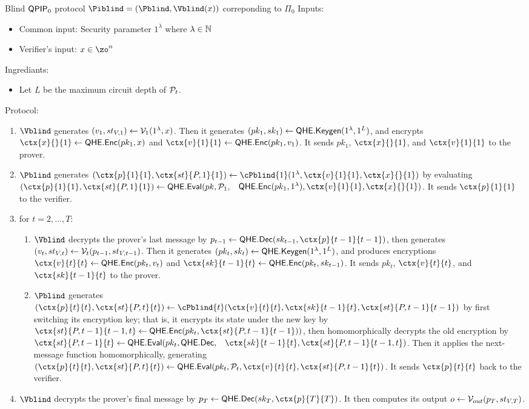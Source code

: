 \begin{protocol}{Blind $\operatorname{\mathsf{QPIP}}_0$ protocol $\Piblind=(\Pblind, \Vblind(x))$ correponding to $\Pi_0$}
	Inputs:
	\begin{itemize}
		\item Common input: Security parameter $1^\lambda$ where $\lambda\in\mathbb{N}$
		\item Verifier's input: $x\in\zo^n$
	\end{itemize}

	Ingrediants:
	\begin{itemize}
		\item Let $L$ be the maximum circuit depth of $\mathcal{P}_t$.
	\end{itemize}

    Protocol:
	\begin{enumerate}
		\item $\Vblind$ generates $(v_1, st_{V, 1})\leftarrow\mathcal{V}_1(1^\lambda, x)$.
			Then it generates $(pk_1, sk_1)\leftarrow\mathsf{QHE.Keygen}(1^\lambda, 1^L)$,
			and encrypts $\ctx{x}{}{1}\leftarrow\QEnc(pk_1, x)$ and $\ctx{v}{1}{1}\leftarrow\QEnc(pk_1, v_1)$.
			It sends $pk_1$, $\ctx{x}{}{1}$, and $\ctx{v}{1}{1}$ to the prover.
		\item $\Pblind$ generates $(\ctx{p}{1}{1}, \ctx{st}{P, 1}{1})\leftarrow\cPblind{1}(1^\lambda, \ctx{v}{1}{1}, \ctx{x}{}{1})$
			by evaluating
			$(\ctx{p}{1}{1}, \ctx{st}{P, 1}{1})\leftarrow  \QEval(pk, \cP_1,$ \  $\QEnc(pk_1, 1^\lambda), \ctx{v}{1}{1}, \ctx{x}{}{1})$.
			It sends $\ctx{p}{1}{1}$ to the verifier.
		\item for $t=2,\ldots,T$:
		\begin{enumerate}
			\item $\Vblind$ decrypts the prover's last message by $p_{t-1}\leftarrow\QDec(sk_{t-1}, \ctx{p}{t-1}{t-1})$,
				then generates $(v_t, st_{V, t})\leftarrow\mathcal{V}_t(p_{t-1}, st_{V, t-1})$.
				Then it generates $(pk_t, sk_t)\leftarrow\mathsf{QHE.Keygen}(1^\lambda, 1^L)$,
				and produces encryptions $\ctx{v}{t}{t}\leftarrow\QEnc(pk_t, v_t)$ and $\ctx{sk}{t-1}{t}\leftarrow\QEnc(pk_t, sk_{t-1})$.
				It sends $pk_t$, $\ctx{v}{t}{t}$, and $\ctx{sk}{t-1}{t}$ to the prover.
			\item $\Pblind$ generates $(\ctx{p}{t}{t}, \ctx{st}{P, t}{t})\leftarrow\cPblind{t}(\ctx{v}{t}{t}, \ctx{sk}{t-1}{t}, \ctx{st}{P, t-1}{t-1})$
				by first switching its encryption key;
				that is, it encrypts its state under the new key by $\ctx{st}{P, t-1}{t-1, t}\leftarrow\QEnc(pk_t, \ctx{st}{P, t-1}{t-1}))$,
				then homomorphically decrypts the old encryption by
				$\ctx{st}{P, t-1}{t}\leftarrow\QEval(pk_t, \QDec,$ \ $\ctx{sk}{t-1}{t}, \ctx{st}{P, t-1}{t-1, t})$.
				Then it applies the next-message function homomorphically, generating
				$(\ctx{p}{t}{t}, \ctx{st}{P, t}{t})\leftarrow\QEval(pk_t, \cP_t, \ctx{v}{t}{t}, \ctx{st}{P, t-1}{t})$.
				It sends $\ctx{p}{t}{t}$ back to the verifier.
		\end{enumerate}
		\item $\Vblind$ decrypts the prover's final message by $p_T\leftarrow\QDec(sk_T, \ctx{p}{T}{T})$.
			It then computes its output $o\leftarrow\mathcal{V}_{out}(p_T, st_{V, T})$.
	\end{enumerate}
\end{protocol}

